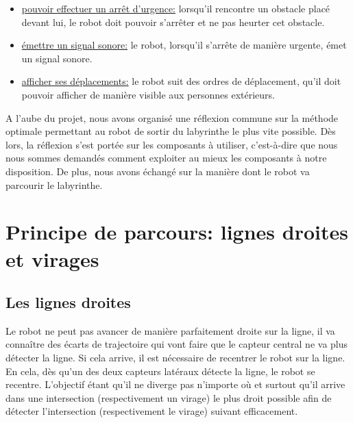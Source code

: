                 \begin{itemize}
                        \item \underline{pouvoir effectuer un arrêt d'urgence:} lorsqu'il rencontre un obstacle placé devant lui, le robot doit pouvoir s'arrêter et ne pas heurter cet obstacle.
                \end{itemize}
                \vspace{1mm}

                \begin{itemize}
                        \item \underline{émettre un signal sonore:} le robot, lorsqu'il s'arrête de manière urgente, émet un signal sonore.
                \end{itemize}
                \vspace{1mm}

                \begin{itemize}
                        \item \underline{afficher ses déplacements:} le robot suit des ordres de déplacement, qu'il doit pouvoir afficher de manière visible aux personnes extérieurs.
                \end{itemize}
                \vspace{3mm}

                A l'aube du projet, nous avons organisé une réflexion commune sur la méthode optimale permettant au robot de sortir du labyrinthe le plus vite possible. Dès lors, la réflexion s'est portée sur les composants à utiliser, c'est-à-dire que nous nous sommes demandés comment exploiter au mieux les composants à notre disposition. De plus, nous avons échangé sur la manière dont le robot va parcourir le labyrinthe.
                \vspace{5mm}


        \section{Principe de parcours: lignes droites et virages}
        \subsection{Les lignes droites}
                Le robot ne peut pas avancer de manière parfaitement droite sur la ligne, il va connaître des écarts de trajectoire qui vont faire que le capteur central ne va plus détecter la ligne. Si cela arrive, il est nécessaire de recentrer le robot sur la ligne. En cela, dès qu'un des deux capteurs latéraux détecte la ligne, le robot se recentre. L'objectif étant qu'il ne diverge pas n'importe où et surtout qu'il arrive dans une intersection (respectivement un virage) le plus droit possible afin de détecter l'intersection (respectivement le virage) suivant efficacement.
